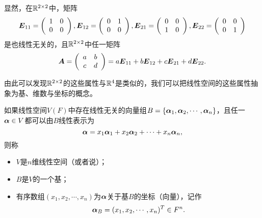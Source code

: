 \begin{frame}
显然，在$\mathbb R^{2\times 2}$中，矩阵
$$
\boldsymbol{E}_{11}=\left(\begin{array}{cc} 1&0\\0&0 \end{array}\right), 
\boldsymbol{E}_{12}=\left(\begin{array}{cc} 0&1\\0&0 \end{array}\right), 
\boldsymbol{E}_{21}=\left(\begin{array}{cc} 0&0\\1&0 \end{array}\right), 
\boldsymbol{E}_{22}=\left(\begin{array}{cc} 0&0\\0&1 \end{array}\right) 
$$
是也线性无关的，且$\mathbb R^{2\times 2}$中任一矩阵
$$
\boldsymbol{A} = \left(\begin{array}{cc} a&b\\c&d \end{array}\right)=a\boldsymbol{E}_{11}+b\boldsymbol{E}_{12}+c\boldsymbol{E}_{21}+d\boldsymbol{E}_{22}.
$$ 

\vspace{.1in} 

\vspace{.1in} 


由此可以发现$\mathbb R^{2\times 2}$的这些属性与$\mathbb R^4$是类似的，我们可以把线性空间的这些属性抽象为基、维数与坐标的概念。
\end{frame}

\begin{frame}
\begin{dingyi}
	如果线性空间$V(F)$中存在线性无关的向量组$B=\{\boldsymbol{\alpha}_1, \boldsymbol{\alpha}_2, \cdots, \boldsymbol{\alpha}_n\}$，且任一$\boldsymbol{\alpha}\in V$都可以由$B$线性表示为
	$$
	\boldsymbol{\alpha}=x_1\boldsymbol{\alpha}_1+x_2\boldsymbol{\alpha}_2+\cdots+x_n\boldsymbol{\alpha}_n,
	$$
	则称
	\begin{itemize}
	\item $V$是$n$维线性空间（或者说）；
	\item $B$是$V$的一个基；
	\item 有序数组$(x_1,x_2,\cdots,x_n)$为$\boldsymbol{\alpha}$关于基$B$的坐标（向量），记作
	$$
	\boldsymbol{\alpha}_B=(x_1,x_2,\cdots,x_n)^T\in F^n.
	$$
	\end{itemize}
\end{dingyi}
\end{frame}

